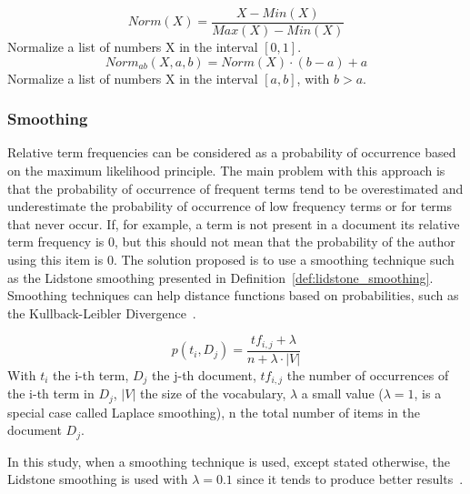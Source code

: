 \begin{definition}
  \label{def:normalization}
  \begin{equation}
    Norm(X) = \frac{X - Min(X)}{Max(X) - Min(X)}
  \end{equation}
  Normalize a list of numbers X in the interval $[0, 1]$.
  \begin{equation}
    Norm_{ab}(X, a, b) = Norm(X) \cdot (b - a) + a
  \end{equation}
  Normalize a list of numbers X in the interval $[a, b]$, with $b > a$.
\end{definition}

\subsubsection{Smoothing}

Relative term frequencies can be considered as a probability of occurrence based on the maximum likelihood principle.
The main problem with this approach is that the probability of occurrence of frequent terms tend to be overestimated and underestimate the probability of occurrence of low frequency terms or for terms that never occur.
If, for example, a term is not present in a document its relative term frequency is 0, but this should not mean that the probability of the author using this item is 0.
The solution proposed is to use a smoothing technique such as the Lidstone smoothing presented in Definition~\ref{def:lidstone_smoothing}.
Smoothing techniques can help distance functions based on probabilities, such as the Kullback-Leibler Divergence~\cite{savoy_stylo}.

\begin{definition}
  \label{def:lidstone_smoothing}
  \begin{equation}
    p(t_i, D_j) = \frac{tf_{i,j} + \lambda}{n + \lambda \cdot |V|}
  \end{equation}
  With $t_i$ the i-th term, $D_j$ the j-th document, $tf_{i,j}$ the number of occurrences of the i-th term in $D_j$, $|V|$ the size of the vocabulary, $\lambda$ a small value ($\lambda = 1$, is a special case called Laplace smoothing), n the total number of items in the document $D_j$.
\end{definition}

In this study, when a smoothing technique is used, except stated otherwise, the Lidstone smoothing is used with $\lambda = 0.1$ since it tends to produce better results~\cite{savoy_stylo}.
